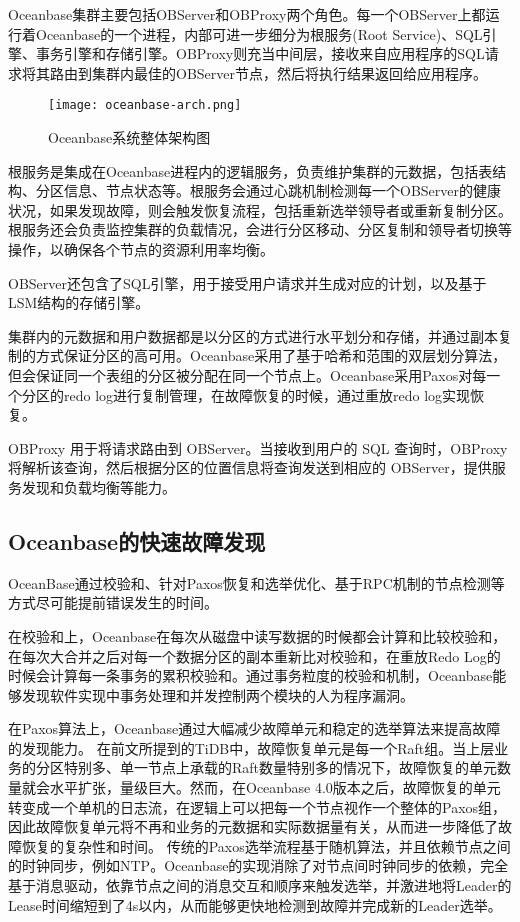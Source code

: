 Oceanbase集群主要包括OBServer和OBProxy两个角色。每一个OBServer上都运行着Oceanbase的一个进程，内部可进一步细分为根服务(Root Service)、SQL引擎、事务引擎和存储引擎。OBProxy则充当中间层，接收来自应用程序的SQL请求将其路由到集群内最佳的OBServer节点，然后将执行结果返回给应用程序。

\begin{figure}
  \centering
  \texttt{[image: oceanbase-arch.png]}
  \caption{Oceanbase系统整体架构图}
  \label{fig:oceanbase-arch}
\end{figure}

根服务是集成在Oceanbase进程内的逻辑服务，负责维护集群的元数据，包括表结构、分区信息、节点状态等。根服务会通过心跳机制检测每一个OBServer的健康状况，如果发现故障，则会触发恢复流程，包括重新选举领导者或重新复制分区。根服务还会负责监控集群的负载情况，会进行分区移动、分区复制和领导者切换等操作，以确保各个节点的资源利用率均衡。

OBServer还包含了SQL引擎，用于接受用户请求并生成对应的计划，以及基于LSM结构的存储引擎。

集群内的元数据和用户数据都是以分区的方式进行水平划分和存储，并通过副本复制的方式保证分区的高可用。Oceanbase采用了基于哈希和范围的双层划分算法，但会保证同一个表组的分区被分配在同一个节点上。Oceanbase采用Paxos对每一个分区的redo log进行复制管理，在故障恢复的时候，通过重放redo log实现恢复。

OBProxy 用于将请求路由到 OBServer。当接收到用户的 SQL 查询时，OBProxy 将解析该查询，然后根据分区的位置信息将查询发送到相应的 OBServer，提供服务发现和负载均衡等能力。


\subsection{Oceanbase的快速故障发现}

OceanBase通过校验和、针对Paxos恢复和选举优化、基于RPC机制的节点检测等方式尽可能提前错误发生的时间。

在校验和上，Oceanbase在每次从磁盘中读写数据的时候都会计算和比较校验和，在每次大合并之后对每一个数据分区的副本重新比对校验和，在重放Redo Log的时候会计算每一条事务的累积校验和。通过事务粒度的校验和机制，Oceanbase能够发现软件实现中事务处理和并发控制两个模块的人为程序漏洞。

在Paxos算法上，Oceanbase通过大幅减少故障单元和稳定的选举算法来提高故障的发现能力。
在前文所提到的TiDB中，故障恢复单元是每一个Raft组。当上层业务的分区特别多、单一节点上承载的Raft数量特别多的情况下，故障恢复的单元数量就会水平扩张，量级巨大。然而，在Oceanbase 4.0版本之后，故障恢复的单元转变成一个单机的日志流，在逻辑上可以把每一个节点视作一个整体的Paxos组，因此故障恢复单元将不再和业务的元数据和实际数据量有关，从而进一步降低了故障恢复的复杂性和时间。
传统的Paxos选举流程基于随机算法，并且依赖节点之间的时钟同步，例如NTP。Oceanbase的实现消除了对节点间时钟同步的依赖，完全基于消息驱动，依靠节点之间的消息交互和顺序来触发选举，并激进地将Leader的Lease时间缩短到了4s以内，从而能够更快地检测到故障并完成新的Leader选举。

